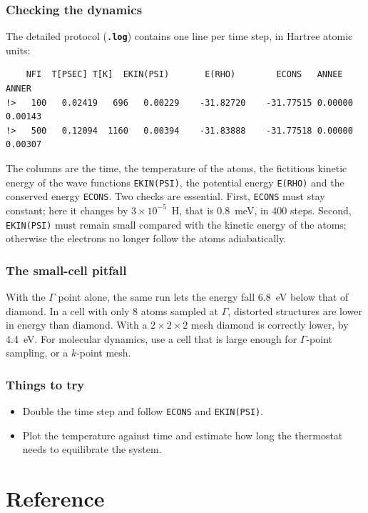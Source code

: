 \documentclass[11pt,a4paper,oneside]{book}
\newcommand{\file}[1]{\textbf{\texttt{#1}}}
\begin{document}
\section{Checking the dynamics}

The detailed protocol (\file{.log}) contains one line per time step,
in Hartree atomic units:
\begin{verbatim}
    NFI  T[PSEC] T[K]  EKIN(PSI)       E(RHO)        ECONS   ANNEE   ANNER
!>   100   0.02419   696   0.00229    -31.82720    -31.77515 0.00000 0.00143
!>   500   0.12094  1160   0.00394    -31.83888    -31.77518 0.00000 0.00307
\end{verbatim}
The columns are the time, the temperature of the atoms, the fictitious
kinetic energy of the wave functions \texttt{EKIN(PSI)}, the potential
energy \texttt{E(RHO)} and the conserved energy \texttt{ECONS}. Two
checks are essential. First, \texttt{ECONS} must stay constant; here it
changes by $3\times10^{-5}$~H, that is 0.8~meV, in 400 steps. Second,
\texttt{EKIN(PSI)} must remain small compared with the kinetic energy of
the atoms; otherwise the electrons no longer follow the atoms
adiabatically.

\section{The small-cell pitfall}

With the $\Gamma$ point alone, the same run lets the energy fall
6.8~eV below that of diamond. In a cell with only 8 atoms sampled at
$\Gamma$, distorted structures are lower in energy than diamond. With a
$2\times2\times2$ mesh diamond is correctly lower, by 4.4~eV. For
molecular dynamics, use a cell that is large enough for $\Gamma$-point
sampling, or a $k$-point mesh.

\section{Things to try}
\begin{itemize}
\item Double the time step and follow \texttt{ECONS} and
  \texttt{EKIN(PSI)}.
\item Plot the temperature against time and estimate how long the
  thermostat needs to equilibrate the system.
\end{itemize}

\part{Reference}
\end{document}
